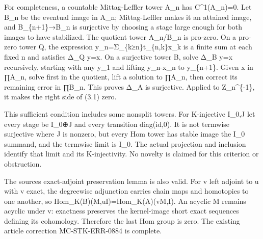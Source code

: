 For completeness,\allowbreak{} a countable Mittag-Leffler tower A\_\allowbreak{}n has C\textasciicircum{}1(A\_\allowbreak{}n)\allowbreak{}\allowbreak{}=0. Let B\_\allowbreak{}n be the eventual image in A\_\allowbreak{}n; Mittag-Leffler makes it an attained image,\allowbreak{} and B\_\allowbreak{}\{n\allowbreak{}+1\}\allowbreak{}→B\_\allowbreak{}n is surjective by choosing a stage large enough for both images to have stabilized. The quotient tower A\_\allowbreak{}n/\allowbreak{}B\_\allowbreak{}n is pro-zero. On a pro-zero tower Q,\allowbreak{} the expression y\_\allowbreak{}n\allowbreak{}=Σ\_\allowbreak{}\{k≥n\}t\_\allowbreak{}\{n,\allowbreak{}k\}x\_\allowbreak{}k is a finite sum at each fixed n and satisfies Δ\_\allowbreak{}Q y\allowbreak{}=x. On a surjective tower B,\allowbreak{} solve Δ\_\allowbreak{}B y\allowbreak{}=x recursively,\allowbreak{} starting with any y\_\allowbreak{}1 and lifting y\_\allowbreak{}n-x\_\allowbreak{}n to y\_\allowbreak{}\{n\allowbreak{}+1\}. Given x in ∏A\_\allowbreak{}n,\allowbreak{} solve first in the quotient,\allowbreak{} lift a solution to ∏A\_\allowbreak{}n,\allowbreak{} then correct its remaining error in ∏B\_\allowbreak{}n. This proves Δ\_\allowbreak{}A is surjective. Applied to Z\_\allowbreak{}n\textasciicircum{}\{-1\},\allowbreak{} it makes the right side of (3.1)\allowbreak{} zero.

This sufficient condition includes some nonsplit towers. For K-injective I\_\allowbreak{}0,\allowbreak{}J let every stage be I\_\allowbreak{}0\allowbreak{}⊕J and every transition diag(id,\allowbreak{}0)\allowbreak{}. It is not termwise surjective where J is nonzero,\allowbreak{} but every Hom tower has stable image the I\_\allowbreak{}0 summand,\allowbreak{} and the termwise limit is I\_\allowbreak{}0. The actual projection and inclusion identify that limit and its K-injectivity. No novelty is claimed for this criterion or obstruction.

The source\textquotesingle s exact-adjoint preservation lemma is also valid. For v left adjoint to u with v exact,\allowbreak{} the degreewise adjunction carries chain maps and homotopies to one another,\allowbreak{} so Hom\_\allowbreak{}K(B)\allowbreak{}(M,\allowbreak{}uI)\allowbreak{}\allowbreak{}=Hom\_\allowbreak{}K(A)\allowbreak{}(vM,\allowbreak{}I)\allowbreak{}. An acyclic M remains acyclic under v:\allowbreak{} exactness preserves the kernel-image short exact sequences defining its cohomology. Therefore the last Hom group is zero. The existing article correction MC-STK-ERR-0884 is complete.

